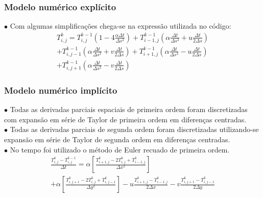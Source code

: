 \documentclass[xcolor=dvipsnames,10pt,aspectratio=169]{beamer}
\begin{document}
	\begin{frame} 
		\frametitle{Modelo numérico explícito}
		$\bullet$ Com algumas simplificações chega-se na expressão utilizada no código:
		\begin{equation}
			\begin{split}
			T_{i,j}^{k} = T_{i,j}^{k-1} \left( 1 - 4 \frac{\alpha \Delta t}{\Delta s ^2}\right) + T_{i -1, j}^{k-1} \left( \alpha \frac{\Delta t}{\Delta s^2} + u \frac{\Delta t}{2 \Delta s} \right)\\
			+ T_{i,j-1}^{k-1} \left( \alpha \frac{\Delta t}{\Delta s^2} + v \frac{\Delta t}{2 \Delta s} \right) +  T_{i+1,j}^{k-1} \left( \alpha \frac{\Delta t}{ \Delta s^2} - u \frac{\Delta t}{2 \Delta s}\right) \\
			+  T_{i,j+1}^{k-1} \left( \alpha \frac{\Delta t}{\Delta s^2} - v \frac{\Delta t}{2 \Delta s}\right)
			\end{split}
		\end{equation}
	\end{frame}





	\begin{frame} 
		\frametitle{Modelo numérico implícito}
		$\bullet$ Todas as derivadas parciais espaciais de primeira ordem foram discretizadas com expansão em série de Taylor de primeira ordem em diferenças centradas.\\
		$\bullet$ Todas as derivadas parciais de segunda ordem foram discretizadas utilizando-se expansão em série de Taylor de segunda ordem em diferenças centradas.\\
		$\bullet$ No tempo foi utilizado o método de Euler recuado de primeira ordem.\\
		\begin{equation}
			\begin{split}
			\frac{T_{i,j}^{k} - T_{i , j}^{k-1} }{\Delta t}
			= \alpha \left[  \frac{T_{i+1,j}^{k} - 2 T_{i,j}^{k} + T_{i-1,j}^{k} }{\Delta x^2} \right]\\
			+\alpha \left[\frac{T_{i,j+1}^{k} - 2 T_{i,j}^{k} + T_{i,j-1}^{k}}{\Delta y^2}\right] - u \frac{T_{i+1,j}^{k} - T_{i-1,j}^{k}}{2 \Delta x} - v \frac{T_{i,j+1}^{k} - T_{i , j-1}^{k}}{2 \Delta y}  
			\end{split}
		\end{equation}
	\end{frame}
\end{document}
